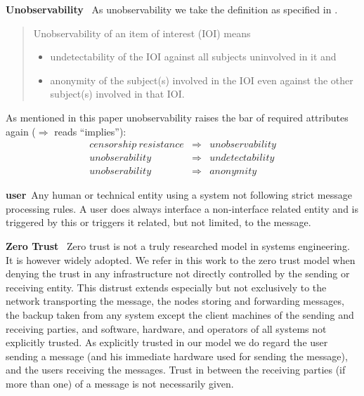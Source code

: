 \documentclass[a4paper,appendixprefix,pdfusetitle,twocolumn,fontsize=8pt,draft,DIV=calc]{scrbook}
\newenvironment{entry}{\par\leavevmode\hangpara{1.5mm}{1}\ignorespaces}{\RaggedRight\par}
\newcommand*{\mainentry}[2]{{\bfseries{#1\label{def:#1}}}~#2\par}
\begin{document}
\begin{entry}
	\mainentry{Unobservability}{
		As unobservability we take the definition as specified in \cite{anonTerminology}.
		\begin{quote}
			Unobservability of an item of interest (IOI) means
			\begin{itemize}
				\item undetectability of the IOI against all subjects uninvolved in it and
				\item anonymity of the subject(s) involved in the IOI even against the other subject(s) involved in that IOI.
			\end{itemize}
		\end{quote}        
		As mentioned in this paper unobservability raises the bar of required attributes again ($\Rightarrow$ reads ``implies''):
		\begin{eqnarray*}
			censorship\ resistance & \Rightarrow & unobservability\\
			unobserability         & \Rightarrow & undetectability\\
			unobserability         & \Rightarrow & anonymity
		\end{eqnarray*}
	}
\end{entry}


\begin{entry}
	\mainentry{user}{Any human or technical entity using a system not following strict message processing rules. A user does always interface a non-interface related entity and is triggered by this or triggers it related, but not limited, to the message.}
\end{entry}

\begin{entry}
	\mainentry{Zero Trust}{
		Zero trust is not a truly researched model in systems engineering. It is however widely adopted. We refer in this work to the zero trust model when denying the trust in any infrastructure not directly controlled by the sending or receiving entity. This distrust extends especially but not exclusively to the network transporting the message, the nodes storing and forwarding messages, the backup taken from any system except the client machines of the sending and receiving parties, and software, hardware, and operators of all systems not explicitly trusted. As explicitly trusted in our model we do regard the user sending a message (and his immediate hardware used for sending the message), and the users receiving the messages. Trust in between the receiving parties (if more than one) of a message is not necessarily given.
	}
\end{entry}        
\end{document}
